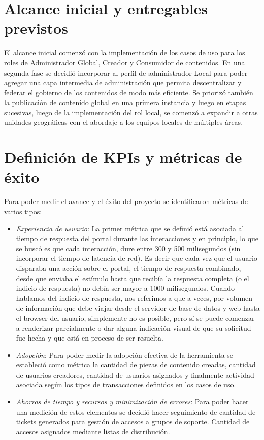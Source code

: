 \section{Alcance inicial y entregables previstos}
El alcance inicial comenzó con la implementación de los casos de uso para los roles de Administrador Global, Creador y Consumidor de contenidos. En una segunda fase se decidió incorporar al perfil de administrador Local para poder agregar una capa intermedia de administración que permita descentralizar y federar el gobierno de los contenidos de modo más eficiente.
Se priorizó también la publicación de contenido global en una primera instancia y luego en etapas sucesivas, luego de la implementación del rol local, se comenzó a expandir a otras unidades geográficas con el abordaje a los equipos locales de múltiples áreas.

\section{Definición de KPIs y métricas de éxito}

Para poder medir el avance y el éxito del proyecto se identificaron métricas de varios tipos:

\begin{itemize}
    \item \textit{Experiencia de usuario}:
	La primer métrica que se definió está asociada al tiempo de respuesta del portal durante las interacciones y en principio, lo que se buscó es que cada interacción, dure entre 300 y 500 milisegundos (sin incorporar el tiempo de latencia de red). Es decir que cada vez que el usuario disparaba una acción sobre el portal, el tiempo de respuesta combinado, desde que enviaba el estímulo hasta que recibía la respuesta completa (o el indicio de respuesta) no debía ser mayor a 1000 milisegundos. Cuando hablamos del indicio de respuesta, nos referimos a que a veces, por volumen de información que debe viajar desde el servidor de base de datos y web hasta el browser del usuario, simplemente no es posible, pero sí se puede comenzar a renderizar parcialmente o dar alguna indicación visual de que su solicitud fue hecha y que está en proceso de ser resuelta.

    \item \textit{Adopción}: Para poder medir la adopción efectiva de la herramienta se estableció como métrica la cantidad de piezas de contenido creadas, cantidad de usuarios creadores, cantidad de usuarios asignados y finalmente actividad asociada según los tipos de transacciones definidos en los casos de uso.

    \item \textit{Ahorros de tiempo y recursos y minimización de errores}:
Para poder hacer una medición de estos elementos se decidió hacer seguimiento de cantidad de tickets generados para gestión de accesos a grupos de soporte. Cantidad de accesos asignados mediante listas de distribución.
\end{itemize}